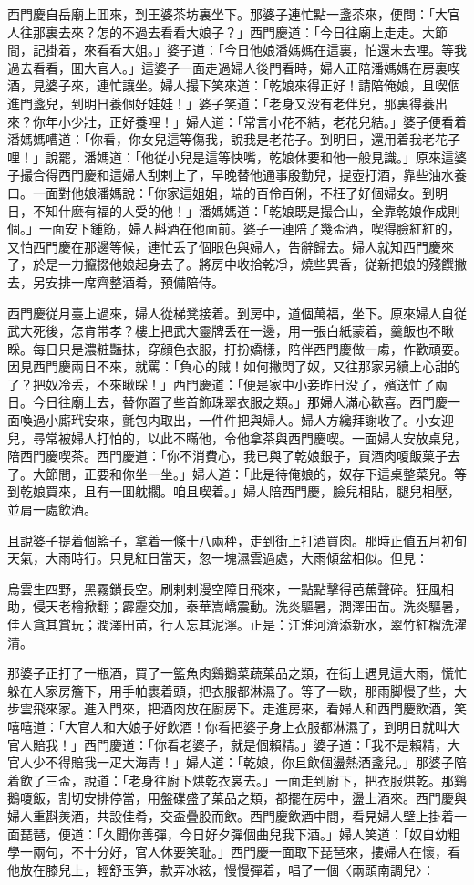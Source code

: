 西門慶自岳廟上囬來，到王婆茶坊裏坐下。那婆子連忙點一盞茶來，便問：「大官人往那裏去來？怎的不過去看看大娘子？」西門慶道：「今日往廟上走走。大節間，記掛着，來看看大姐。」婆子道：「今日他娘潘媽媽在這裏，怕還未去哩。等我過去看看，囬大官人。」這婆子一面走過婦人後門看時，婦人正陪潘媽媽在房裏喫酒，見婆子來，連忙讓坐。婦人撮下笑來道：「乾娘來得正好！請陪俺娘，且喫個進門盞兒，到明日養個好娃娃！」婆子笑道：「老身又没有老伴兒，那裏得養出來？你年小少壯，正好養哩！」婦人道：「常言小花不結，老花兒結。」婆子便看着潘媽媽嘈道：「你看，你女兒這等傷我，說我是老花子。到明日，還用着我老花子哩！」說罷，潘媽道：「他従小兒是這等快嘴，乾娘休要和他一般見識。」原來這婆子撮合得西門慶和這婦人刮剌上了，早晚替他通事殷勤兒，提壺打酒，靠些油水養口。一面對他娘潘媽說：「你家這姐姐，端的百伶百俐，不枉了好個婦女。到明日，不知什麽有福的人受的他！」潘媽媽道：「乾娘既是撮合山，全靠乾娘作成則個。」一面安下鍾筯，婦人斟酒在他面前。婆子一連陪了幾盃酒，喫得臉紅紅的，又怕西門慶在那邊等候，連忙丢了個眼色與婦人，告辭歸去。婦人就知西門慶來了，於是一力攛掇他娘起身去了。將房中收拾乾凈，燒些異香，従新把娘的殘饌撇去，另安排一席齊整酒肴，預備陪侍。

西門慶従月臺上過來，婦人從梯凳接着。到房中，道個萬福，坐下。原來婦人自従武大死後，怎肯带孝？樓上把武大靈牌丢在一邊，用一張白紙蒙着，羹飯也不瞅睬。每日只是濃粧豔抹，穿顔色衣服，打扮嬌樣，陪伴西門慶做一䖏，作歡頑耍。因見西門慶兩日不來，就罵：「負心的賊！如何撇閃了奴，又往那家另續上心甜的了？把奴冷丢，不來瞅睬！」西門慶道：「便是家中小妾昨日没了，殯送忙了兩日。今日往廟上去，替你置了些首飾珠翠衣服之類。」那婦人滿心歡喜。西門慶一面喚過小廝玳安來，氈包内取出，一件件把與婦人。婦人方纔拜謝收了。小女迎兒，尋常被婦人打怕的，以此不瞞他，令他拿茶與西門慶喫。一面婦人安放桌兒，陪西門慶喫茶。西門慶道：「你不消費心，我已與了乾娘銀子，買酒肉嗄飯菓子去了。大節間，正要和你坐一坐。」婦人道：「此是待俺娘的，奴存下這桌整菜兒。等到乾娘買來，且有一囬躭擱。咱且喫着。」婦人陪西門慶，臉兒相貼，腿兒相壓，並肩一處飲酒。

且說婆子提着個籃子，拿着一條十八兩秤，走到街上打酒買肉。那時正值五月初旬天氣，大雨時行。只見紅日當天，忽一塊濕雲過處，大雨傾盆相似。但見：

烏雲生四野，黑霧鎖長空。刷剌剌漫空障日飛來，一點點擊得芭蕉聲碎。狂風相助，侵天老檜掀翻；霹靂交加，泰華嵩嶠震動。洗炎驅暑，潤澤田苗。洗炎驅暑，佳人貪其賞玩；潤澤田苗，行人忘其泥濘。正是：江淮河濟添新水，翠竹紅榴洗濯清。

那婆子正打了一瓶酒，買了一籃魚肉鷄鵝菜蔬菓品之類，在街上遇見這大雨，慌忙躲在人家房簷下，用手帕裹着頭，把衣服都淋濕了。等了一歇，那雨脚慢了些，大步雲飛來家。進入門來，把酒肉放在廚房下。走進房來，看婦人和西門慶飲酒，笑嘻嘻道：「大官人和大娘子好飲酒！你看把婆子身上衣服都淋濕了，到明日就叫大官人賠我！」西門慶道：「你看老婆子，就是個賴精。」婆子道：「我不是賴精，大官人少不得賠我一疋大海青！」婦人道：「乾娘，你且飲個盪熱酒盞兒。」那婆子陪着飲了三盃，說道：「老身往廚下烘乾衣裳去。」一面走到廚下，把衣服烘乾。那鷄鵝嗄飯，割切安排停當，用盤碟盛了菓品之類，都擺在房中，盪上酒來。西門慶與婦人重斟羙酒，共設佳肴，交盃疊股而飲。西門慶飲酒中間，看見婦人壁上掛着一面琵琶，便道：「久聞你善彈，今日好夕彈個曲兒我下酒。」婦人笑道：「奴自幼粗學一兩句，不十分好，官人休要笑耻。」西門慶一面取下琵琶來，摟婦人在懷，看他放在膝兒上，輕舒玉笋，款弄冰絃，慢慢彈着，唱了一個〈兩頭南調兒〉：

